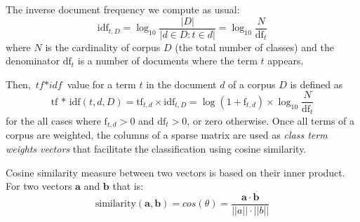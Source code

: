 \documentclass[conference]{IEEEtran}
\begin{document}
The inverse document frequency we compute as usual:
\begin{equation}
 \mbox{idf}_{t, D} =  \log_{10}\frac{|D|}{|d \in D : t \in d|} = \log_{10}\frac{N}{\mbox{df}_{t}}
\end{equation} 
where $N$ is the cardinality of corpus $D$ (the total number of classes) and the 
denominator $\mbox{df}_{t}$ is a number of documents where the term $t$ appears.

Then, $\textit{tf$\ast$idf}$ value for a term $t$ in the document $d$ of a corpus $D$ is defined as 
\begin{equation}
 \mbox{tf * idf}(t, d, D) =  \mbox{tf}_{t, d} \times \mbox{idf}_{t, D} = \log(1 + \mbox{f}_{t,d})
\times \log_{10}\frac{N}{\mbox{df}_{t}}
 \label{formula:tfidf}
\end{equation} 
for the all cases where $\mbox{f}_{t,d}>0$ and $\mbox{df}_{t}>0$, or zero otherwise.
Once all terms of a corpus are weighted, the columns of a sparse matrix are used 
as \textit{class term weights vectors} that facilitate the classification using cosine similarity. 

\enlargethispage{0.5cm} 
Cosine similarity measure between two vectors is based on their inner product. 
For two vectors $\boldsymbol{a}$ and $\boldsymbol{b}$ that is:
\begin{equation}
\mbox{similarity}(\boldsymbol{a},\boldsymbol{b}) = cos(\theta) = \frac{ 
\mathbf{a} \cdot \mathbf{b} } {\left| \left| a \right| \right| \cdot \left| \left| b \right|
\right|}
\end{equation} 

\end{document}

